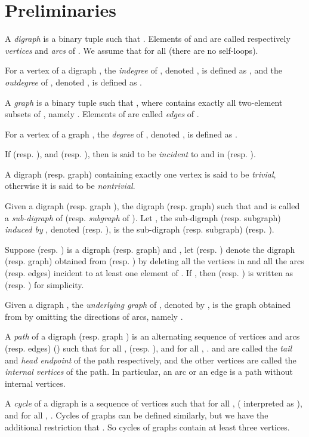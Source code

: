 \documentclass{article}
\begin{document}
\section{Preliminaries}\label{sec:prelim}


A \emph{digraph}  is a binary tuple  such that . Elements of  and  are called respectively
\emph{vertices} and \emph{arcs} of . We assume that  for all  (there are no self-loops).

For a vertex  of a digraph , the \emph{indegree} of ,
denoted , is defined as , and the \emph{outdegree} of , denoted , is
defined as .

A \emph{graph}  is a binary tuple  such that , where  contains exactly all two-element subsets
of , namely . Elements
of  are called \emph{edges} of .

For a vertex  of a graph , the \emph{degree} of ,
denoted , is defined as .

If  (resp. ), and  (resp.
), then  is said to be \emph{incident} to 
and  in  (resp. ).

A digraph (resp. graph) containing exactly one vertex is said to be
\emph{trivial}, otherwise it is said to be \emph{nontrivial}.


Given a digraph  (resp. graph ), the digraph
(resp. graph)  such that  and  is called a \emph{sub-digraph} of  (resp.
\emph{subgraph} of ). Let , the sub-digraph (resp.
subgraph) \emph{induced by} , denoted  (resp. ), is
the sub-digraph (resp. subgraph)  (resp. ).



Suppose  (resp. ) is a digraph (resp. graph) and
, let  (resp. ) denote the digraph (resp.
graph) obtained from  (resp. ) by deleting all the vertices in
 and all the arcs (resp. edges) incident to at least one element
of . If , then  (resp. ) is written as
 (resp. ) for simplicity.

Given a digraph , the \emph{underlying graph} of ,
denoted by , is the graph obtained from  by
omitting the directions of arcs, namely .

A \emph{path} of a digraph  (resp. graph ) is an
alternating sequence of vertices and arcs (resp. edges)
 () such that for all ,  (resp. ), and for all , .  and 
are called the \emph{tail} and \emph{head endpoint} of the path
respectively, and the other vertices are called the \emph{internal
vertices} of the path. In particular, an arc or an edge is a path
without internal vertices.

A \emph{cycle} of a digraph  is a sequence of vertices
 such that for all ,  ( interpreted as ), and for all , . Cycles of graphs can be defined similarly,
but we have the additional restriction that . So cycles of
graphs contain at least three vertices.
\end{document}
